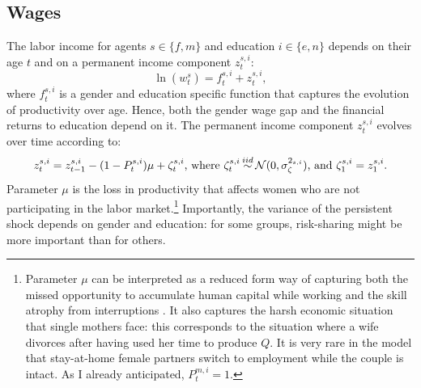 \documentclass[12pt]{article}
\newcommand\iidsim{\stackrel{\mathclap{iid}}{\sim}}
\begin{document}
\subsection{Wages}
The labor income for agents $s\in\{f,m\}$ and education $i\in\{e,n\}$ depends on their age $t$ and on a permanent income component $z^{s,i}_t$:
\[\ln(w^s_t)=f^{s,i}_t+z^{s,i}_t,\]
where $f^{s,i}_t$ is a gender and education specific function that captures the evolution of productivity over age. Hence, both the gender wage gap and the financial returns to education depend on it. The permanent income component  $z^{s,i}_t$ evolves over time according to:
\begin{equation}\label{eq:pcomp}
z^{s,i}_t=z^{s,i}_{t-1}-(1-P_t^{s,i}) \mu+\zeta^{s,i}_{t}\text{, where }\zeta^{s,i}_{t}\iidsim\mathcal{N}(0,\sigma_\zeta^{2_{s,i}})\text{, and }\zeta^{s,i}_{1}=z^{s,i}_{1}.
\end{equation}
Parameter $\mu$ is the loss in productivity that affects women who are not participating in the labor market.\footnote{Parameter $\mu$ can be interpreted as a reduced form way of capturing both the missed opportunity to accumulate human capital while working and the skill atrophy from interruptions \citep{adda2017}. It also captures the harsh economic situation that single mothers face: this corresponds to the situation where a wife divorces after having used her time to produce $Q$. It is very rare in the model that stay-at-home female partners switch to employment while the couple is intact. As I already anticipated, $P_t^{m,i}=1$.} Importantly, the variance of the persistent shock depends on gender and education: for some groups, risk-sharing might be more important than for others.
\end{document}
